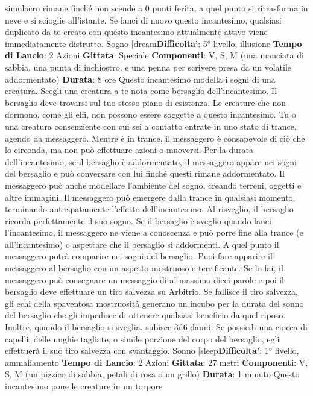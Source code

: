 \begin{multicols}{2}
simulacro rimane finché non scende a 0 punti ferita, a
quel punto si ritrasforma in neve e si scioglie all’istante.
Se lanci di nuovo questo incantesimo, qualsiasi
duplicato da te creato con questo incantesimo
attualmente attivo viene immediatamente distrutto.
Sogno
[dream\textbf{Difficolta'}:
5° livello, illusione
\textbf{Tempo di Lancio}: 2 Azioni
\textbf{Gittata}: Speciale
\textbf{Componenti}: V, S, M (una manciata di sabbia, una
punta di inchiostro, e una penna per scrivere presa da
un volatile addormentato)
\textbf{Durata}: 8 ore
Questo incantesimo modella i sogni di una creatura.
Scegli una creatura a te nota come bersaglio
dell’incantesimo. Il bersaglio deve trovarsi sul tuo
stesso piano di esistenza. Le creature che non
dormono, come gli elfi, non possono essere soggette a
questo incantesimo. Tu o una creatura consenziente
con cui sei a contatto entrate in uno stato di trance,
agendo da messaggero. Mentre è in trance, il
messaggero è consapevole di ciò che lo circonda, ma
non può effettuare azioni o muoversi.
Per la durata dell’incantesimo, se il bersaglio è
addormentato, il messaggero appare nei sogni del
bersaglio e può conversare con lui finché questi rimane
addormentato. Il messaggero può anche modellare
l’ambiente del sogno, creando terreni, oggetti e altre
immagini. Il messaggero può emergere dalla trance in
qualsiasi momento, terminando anticipatamente l’effetto
dell’incantesimo. Al risveglio, il bersaglio ricorda
perfettamente il suo sogno. Se il bersaglio è sveglio
quando lanci l’incantesimo, il messaggero ne viene a
conoscenza e può porre fine alla trance (e
all’incantesimo) o aspettare che il bersaglio si
addormenti. A quel punto il messaggero potrà
comparire nei sogni del bersaglio.
Puoi fare apparire il messaggero al bersaglio con un
aspetto mostruoso e terrificante. Se lo fai, il
messaggero può consegnare un messaggio di al
massimo dieci parole e poi il bersaglio deve effettuare
un tiro salvezza su Arbitrio. Se fallisce il tiro
salvezza, gli echi della spaventosa mostruosità
generano un incubo per la durata del sonno del
bersaglio che gli impedisce di ottenere qualsiasi
beneficio da quel riposo. Inoltre, quando il bersaglio si
sveglia, subisce 3d6 danni.
Se possiedi una ciocca di capelli, delle unghie tagliate,
o simile porzione del corpo del bersaglio, egli effettuerà
il suo tiro salvezza con svantaggio.
Sonno
[sleep\textbf{Difficolta'}:
1° livello, ammaliamento
\textbf{Tempo di Lancio}: 2 Azioni
\textbf{Gittata}: 27 metri
\textbf{Componenti}: V, S, M (un pizzico di sabbia, petali di
rosa o un grillo)
\textbf{Durata}: 1 minuto
Questo incantesimo pone le creature in un torpore

\end{multicols}
